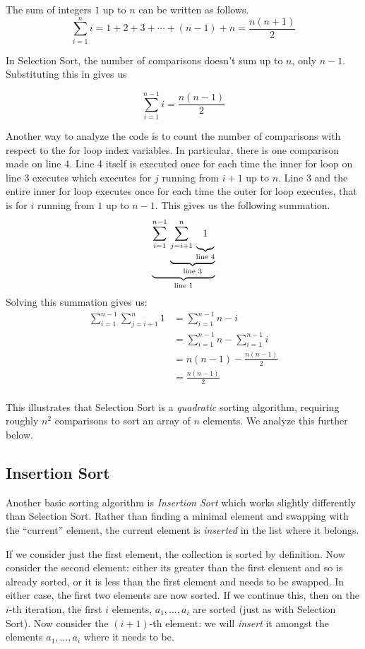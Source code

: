 \begin{theorem}
The sum of integers $1$ up to $n$ can be written as follows.
$$\sum_{i=1}^{n} i = 1 + 2 + 3 + \cdots + (n-1) + n = \frac{n(n+1)}{2}$$
\end{theorem}

In Selection Sort, the number of comparisons doesn't sum up to $n$, 
only $n-1$.  Substituting this in gives us 

$$\sum_{i=1}^{n-1} i = \frac{n(n-1)}{2}$$

Another way to analyze the code is to count the number of comparisons
with respect to the for loop index variables.  In particular, there
is one comparison made on line 4.  Line 4 itself is executed once
for each time the inner for loop on line 3 executes which executes 
for $j$ running from $i+1$ up to $n$.  Line 3 and the entire inner
for loop executes once for each time the outer for loop executes, 
that is for $i$ running from $1$ up to $n-1$. This gives us the 
following summation.
  $$\underbrace{\sum_{i=1}^{n-1} \, \underbrace{\sum_{j=i+1}^{n} \, \underbrace{
  \vphantom{\left(\frac{a^{0.3}}{b}\right)}
1}_{\textrm{line 4}}}_{\textrm{line 3}}}_{\textrm{line 1}}$$
Solving this summation gives us:
\begin{align*}
  \sum_{i=1}^{n-1} \sum_{j=i+1}^{n} 1 & = \sum_{i=1}^{n-1} n-i \\
  ~ & = \sum_{i=1}^{n-1} n - \sum_{i=1}^{n-1} i \\
  ~ & = n(n-1) - \frac{n(n-1)}{2}\\
  ~ & = \frac{n(n-1)}{2}\\
\end{align*}

This illustrates that Selection Sort is a \emph{quadratic} sorting algorithm, 
requiring roughly $n^2$ comparisons to sort an array of $n$ elements.
We analyze this further below.

\subsection{Insertion Sort}

Another basic sorting algorithm is \emph{Insertion Sort} which works 
slightly differently than Selection Sort.  Rather than finding a minimal
element and swapping with the ``current'' element, the current element
is \emph{inserted} in the list where it belongs.

If we consider just the first element, the collection is sorted by
definition.  Now consider the second element: either its greater than
the first element and so is already sorted, or it is less than the first element
and needs to be swapped.  In either case, the first two elements are now
sorted.  If we continue this, then on the $i$-th iteration, the first
$i$ elements, $a_1, \ldots, a_i$ are sorted (just as with Selection Sort).
Now consider the $(i+1)$-th element: we will \emph{insert} it amongst
the elements $a_1, \ldots, a_i$ where it needs to be.

